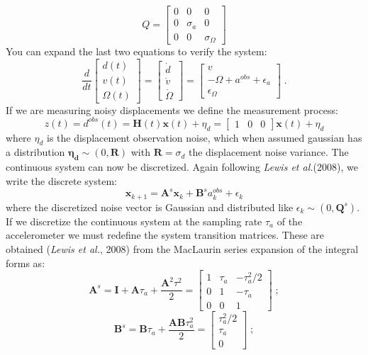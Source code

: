 \documentclass[paper=a4, fontsize=11pt]{scrartcl} %
\numberwithin{equation}{section} %
\numberwithin{figure}{section} %
\numberwithin{table}{section} %
\begin{document}
$$
Q=\left[\begin{matrix}
 0 & 0 & 0 \\
 0 & \sigma_a & 0 \\
 0 & 0 & \sigma_\Omega
\end{matrix}\right]
$$
You can expand the last two equations to verify the system:
$$
\frac{d}{dt}
\left[\begin{matrix}
  d(t) \\
  v(t) \\
  \Omega(t)
\end{matrix}\right]=
\left[\begin{matrix}
  \dot{d} \\
  \dot{v} \\
  \dot{\Omega}
\end{matrix}\right]=
\left[\begin{matrix}
  v\\
  -\Omega+a^{obs}+\epsilon_a \\
  \epsilon_\Omega
\end{matrix}\right]\;.
$$
If we are measuring noisy displacements we define the measurement process:
$$
z(t)=d^{obs}(t)=\mathbf{H}(t)\mathbf{x}(t)+\eta_d=
\left[\begin{matrix}
 1 & 0 & 0
\end{matrix}\right]\mathbf{x}(t)+\eta_d
$$
where $\eta_d$ is the displacement observation noise, which when assumed gaussian has a distribution $\mathbf{\eta_d}\sim(0,\mathbf{R})$ with $\mathbf{R}=\sigma_d$ the displacement noise variance. The continuous system can now be discretized. Again following \textit{Lewis et al.}(2008), we write the discrete system:
$$
\mathbf{x}_{k+1}=\mathbf{A}^s\mathbf{x}_k+\mathbf{B}^sa^{obs}_k+\epsilon_k
$$
where the discretized noise vector is Gaussian and distributed like $\epsilon_k\sim(0,\mathbf{Q}^s)$. If we discretize the continuous system at the sampling rate $\tau_a$ of the accelerometer we must redefine the system transition matrices. These are obtained (\textit{Lewis et al.}, 2008) from the MacLaurin series expansion of the integral forms as:
$$
\mathbf{A}^s=\mathbf{I}+\mathbf{A}\tau_a+\frac{\mathbf{A}^2\tau^2}{2}=\left[\begin{matrix}
1 & \tau_a & -\tau_a^2/2 \\
0 & 1 & -\tau_a \\
0 & 0 & 1 \end{matrix}\right]\;;
$$
$$
\mathbf{B}^s=\mathbf{B}\tau_a+\frac{\mathbf{A}\mathbf{B}\tau_a^2}{2}=\left[\begin{matrix}
\tau^2_a/2 \\
\tau_a \\
0 \end{matrix}\right]\;;
$$
\end{document}
